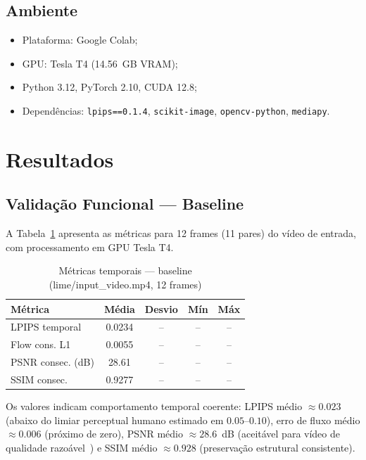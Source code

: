 \documentclass[conference]{IEEEtran}
\begin{document}
\subsection{Ambiente}
\begin{itemize}
    \item Plataforma: Google Colab;
    \item GPU: Tesla T4 (14.56~GB VRAM);
    \item Python 3.12, PyTorch 2.10, CUDA 12.8;
    \item Dependências: \texttt{lpips==0.1.4}, \texttt{scikit-image}, \texttt{opencv-python}, \texttt{mediapy}.
\end{itemize}

\section{Resultados}

\subsection{Validação Funcional — Baseline}

A Tabela~\ref{tab:baseline} apresenta as métricas para 12 frames (11 pares) do vídeo de entrada, com processamento em GPU Tesla T4.

\begin{table}[H]
\caption{Métricas temporais — baseline (lime/input\_video.mp4, 12 frames)}
\label{tab:baseline}
\centering
\begin{tabular}{lcccc}
\toprule
\textbf{Métrica} & \textbf{Média} & \textbf{Desvio} & \textbf{Mín} & \textbf{Máx} \\
\midrule
LPIPS temporal      & 0.0234 & -- & -- & -- \\
Flow cons. L1       & 0.0055 & -- & -- & -- \\
PSNR consec. (dB)   & 28.61  & -- & -- & -- \\
SSIM consec.        & 0.9277 & -- & -- & -- \\
\bottomrule
\end{tabular}
\end{table}

Os valores indicam comportamento temporal coerente: LPIPS médio $\approx 0.023$ (abaixo do limiar perceptual humano estimado em $0.05$--$0.10$), erro de fluxo médio $\approx 0.006$ (próximo de zero), PSNR médio $\approx 28.6$~dB (aceitável para vídeo de qualidade razoável~\cite{szeliski}) e SSIM médio $\approx 0.928$ (preservação estrutural consistente).
\end{document}
